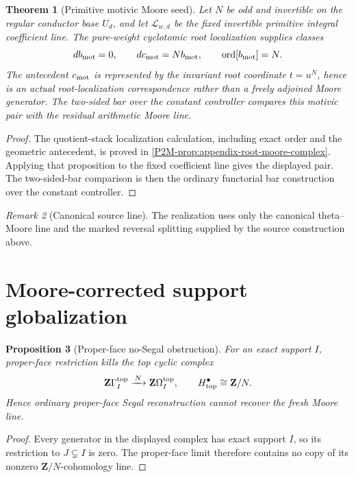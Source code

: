\documentclass[11pt]{article}
\newtheorem{theorem}{Theorem}[section]
\newtheorem{proposition}[theorem]{Proposition}
\theoremstyle{remark}
\newtheorem{remark}[theorem]{Remark}
\begin{document}
\begin{theorem}[Primitive motivic Moore seed]
\label{P2L-thm:v48r4-motivic-seed}
Let \(N\) be odd and invertible on the regular conductor base \(U_d\), and let
\(\mathcal L_{w,d}\) be the fixed invertible primitive integral coefficient
line.  The pure-weight cyclotomic root localization supplies classes
\[
 db_{\rm mot}=0,\qquad
 dc_{\rm mot}=Nb_{\rm mot},\qquad
 \operatorname{ord}[b_{\rm mot}]=N.
\]
The antecedent \(c_{\rm mot}\) is represented by the invariant root coordinate
\(t=u^N\), hence is an actual root-localization correspondence rather than a
freely adjoined Moore generator.  The two-sided bar over the constant
controller compares this motivic pair with the residual arithmetic Moore line.
\end{theorem}

\begin{proof}
The quotient-stack localization calculation, including exact order and the
geometric antecedent, is proved in
\cref{P2M-prop:appendix-root-moore-complex}.  Applying that proposition to the
fixed coefficient line gives the displayed pair.  The two-sided-bar comparison
is then the ordinary functorial bar construction over the constant controller.
\end{proof}

\begin{remark}[Canonical source line]
The realization uses only the canonical theta--Moore line and the marked
reversal splitting supplied by the source construction above.
\end{remark}

\section{Moore-corrected support globalization}

\begin{proposition}[Proper-face no-Segal obstruction]
\label{P2R-thm:v42-no-segal}
For an exact support \(I\), proper-face restriction kills the top cyclic
complex
\[
 \mathbf Z\Gamma_I^{\rm top}\xrightarrow{\,N\,}
 \mathbf Z\Omega_I^{\rm top},
 \qquad
 H^\bullet_{\rm top}\cong\mathbf Z/N.
\]
Hence ordinary proper-face Segal reconstruction cannot recover the fresh
Moore line.
\end{proposition}

\begin{proof}
Every generator in the displayed complex has exact support \(I\), so its
restriction to \(J\subsetneq I\) is zero.  The proper-face limit therefore
contains no copy of its nonzero \(\mathbf Z/N\)-cohomology line.
\end{proof}
\end{document}
